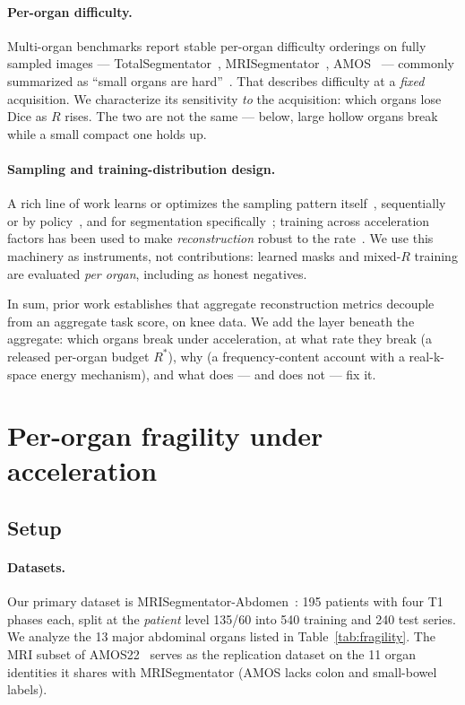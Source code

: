 \documentclass[10pt,twocolumn,letterpaper]{article}
\begin{document}
\paragraph{Per-organ difficulty.}
Multi-organ benchmarks report stable per-organ difficulty orderings on fully sampled images --- TotalSegmentator~\cite{wasserthal2023totalseg}, MRISegmentator~\cite{mrisegmentator2024}, AMOS~\cite{amos2022} --- commonly summarized as ``small organs are hard''~\cite{isensee2021}. That describes difficulty at a \emph{fixed} acquisition. We characterize its sensitivity \emph{to} the acquisition: which organs lose Dice as $R$ rises. The two are not the same --- below, large hollow organs break while a small compact one holds up.

\paragraph{Sampling and training-distribution design.}
A rich line of work learns or optimizes the sampling pattern itself~\cite{bahadir2020loupe,huijben2020,weiss2021,sanchez2020,defazio2020}, sequentially or by policy~\cite{bakker2020,pineda2020}, and for segmentation specifically~\cite{razumov2023}; training across acceleration factors has been used to make \emph{reconstruction} robust to the rate~\cite{yao2022}. We use this machinery as instruments, not contributions: learned masks and mixed-$R$ training are evaluated \emph{per organ}, including as honest negatives.

In sum, prior work establishes that aggregate reconstruction metrics decouple from an aggregate task score, on knee data. We add the layer beneath the aggregate: which organs break under acceleration, at what rate they break (a released per-organ budget $R^{*}$), why (a frequency-content account with a real-k-space energy mechanism), and what does --- and does not --- fix it.

\section{Per-organ fragility under acceleration}
\label{sec:fragility}

\subsection{Setup}
\paragraph{Datasets.}
Our primary dataset is MRISegmentator-Abdomen~\cite{mrisegmentator2024}: 195 patients with four T1 phases each, split at the \emph{patient} level 135/60 into 540 training and 240 test series. We analyze the 13 major abdominal organs listed in Table~\ref{tab:fragility}. The MRI subset of AMOS22~\cite{amos2022} serves as the replication dataset on the 11 organ identities it shares with MRISegmentator (AMOS lacks colon and small-bowel labels).
\end{document}
